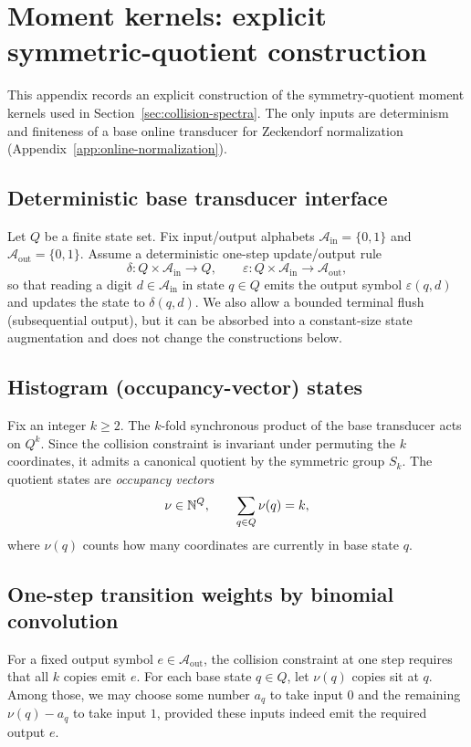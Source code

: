 \section{Moment kernels: explicit symmetric-quotient construction}\label{app:moment-kernel}

This appendix records an explicit construction of the symmetry-quotient moment kernels used in Section~\ref{sec:collision-spectra}.
The only inputs are determinism and finiteness of a base online transducer for Zeckendorf normalization (Appendix~\ref{app:online-normalization}).

\subsection{Deterministic base transducer interface}\label{app:mk-base}
Let $Q$ be a finite state set.
Fix input/output alphabets
\(
\mathcal{A}_{\mathrm{in}}=\{0,1\}
\)
and
\(
\mathcal{A}_{\mathrm{out}}=\{0,1\}.
\)
Assume a deterministic one-step update/output rule
\begin{equation}\label{eq:mk-base-delta-eps}
\delta:Q\times\mathcal{A}_{\mathrm{in}}\to Q,
\qquad
\varepsilon:Q\times\mathcal{A}_{\mathrm{in}}\to\mathcal{A}_{\mathrm{out}},
\end{equation}
so that reading a digit $d\in\mathcal{A}_{\mathrm{in}}$ in state $q\in Q$ emits the output symbol $\varepsilon(q,d)$ and updates the state to $\delta(q,d)$.
We also allow a bounded terminal flush (subsequential output), but it can be absorbed into a constant-size state augmentation and does not change the constructions below.

\subsection{Histogram (occupancy-vector) states}\label{app:mk-histogram}
Fix an integer $k\ge 2$.
The $k$-fold synchronous product of the base transducer acts on $Q^k$.
Since the collision constraint is invariant under permuting the $k$ coordinates, it admits a canonical quotient by the symmetric group $S_k$.
The quotient states are \emph{occupancy vectors}
\begin{equation}\label{eq:mk-occupancy}
\nu\in\mathbb{N}^{Q},
\qquad
\sum_{q\in Q}\nu(q)=k,
\end{equation}
where $\nu(q)$ counts how many coordinates are currently in base state $q$.

\subsection{One-step transition weights by binomial convolution}\label{app:mk-transition-weights}
For a fixed output symbol $e\in\mathcal{A}_{\mathrm{out}}$, the collision constraint at one step requires that all $k$ copies emit $e$.
For each base state $q\in Q$, let $\nu(q)$ copies sit at $q$.
Among those, we may choose some number $a_q$ to take input $0$ and the remaining $\nu(q)-a_q$ to take input $1$, provided these inputs indeed emit the required output $e$.

